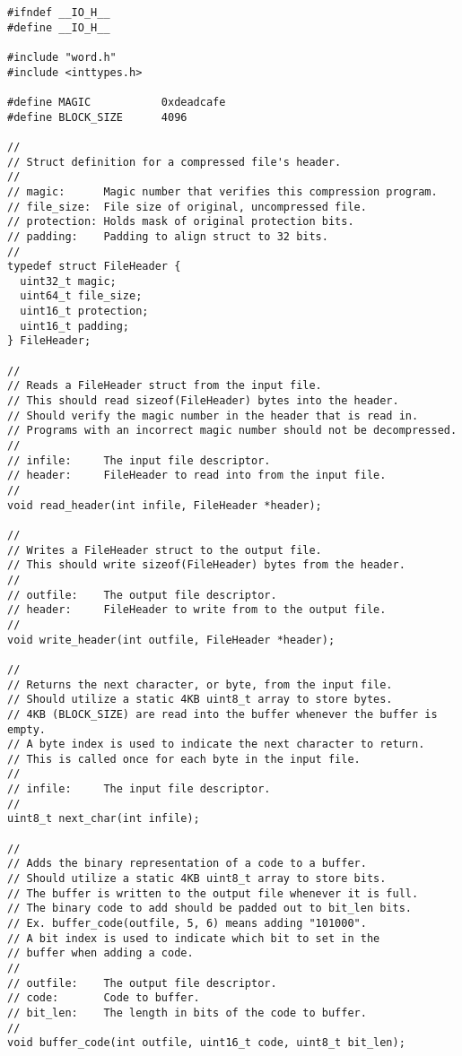 \documentclass{article}
\begin{document}
\begin{lstlisting}[title=io.h]
#ifndef __IO_H__
#define __IO_H__

#include "word.h"
#include <inttypes.h>

#define MAGIC           0xdeadcafe
#define BLOCK_SIZE      4096

//
// Struct definition for a compressed file's header.
//
// magic:      Magic number that verifies this compression program.
// file_size:  File size of original, uncompressed file.
// protection: Holds mask of original protection bits.
// padding:    Padding to align struct to 32 bits.
//
typedef struct FileHeader {
  uint32_t magic;
  uint64_t file_size;
  uint16_t protection;
  uint16_t padding;
} FileHeader;

//
// Reads a FileHeader struct from the input file.
// This should read sizeof(FileHeader) bytes into the header.
// Should verify the magic number in the header that is read in.
// Programs with an incorrect magic number should not be decompressed.
//
// infile:     The input file descriptor.
// header:     FileHeader to read into from the input file.
//
void read_header(int infile, FileHeader *header);

//
// Writes a FileHeader struct to the output file.
// This should write sizeof(FileHeader) bytes from the header.
//
// outfile:    The output file descriptor.
// header:     FileHeader to write from to the output file.
//
void write_header(int outfile, FileHeader *header);

//
// Returns the next character, or byte, from the input file.
// Should utilize a static 4KB uint8_t array to store bytes.
// 4KB (BLOCK_SIZE) are read into the buffer whenever the buffer is empty.
// A byte index is used to indicate the next character to return.
// This is called once for each byte in the input file.
//
// infile:     The input file descriptor.
//
uint8_t next_char(int infile);

//
// Adds the binary representation of a code to a buffer.
// Should utilize a static 4KB uint8_t array to store bits.
// The buffer is written to the output file whenever it is full.
// The binary code to add should be padded out to bit_len bits.
// Ex. buffer_code(outfile, 5, 6) means adding "101000".
// A bit index is used to indicate which bit to set in the
// buffer when adding a code.
//
// outfile:    The output file descriptor.
// code:       Code to buffer.
// bit_len:    The length in bits of the code to buffer.
//
void buffer_code(int outfile, uint16_t code, uint8_t bit_len);


\end{lstlisting}
\end{document}
